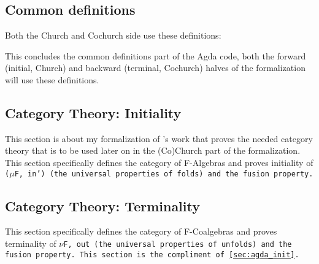\subsection{Common definitions}
Both the Church and Cochurch side use these definitions:

%
This concludes the common definitions part of the Agda code, both the forward (initial, Church) and backward (terminal, Cochurch) halves of the formalization will use these definitions.

\subsection{Category Theory: Initiality}\label{sec:agda_init}
This section is about my formalization of \cite{Harper2011}'s work that proves the needed category theory that is to be used later on in the (Co)Church part of the formalization.
This section specifically defines the category of F-Algebras and proves initiality of \tt($\mu$F, in') (the universal properties of folds) and the fusion property.



\subsection{Category Theory: Terminality}
This section specifically defines the category of F-Coalgebras and proves terminality of \tt{$\nu$F, out} (the universal properties of unfolds) and the fusion property.
This section is the compliment of \autoref{sec:agda_init}.


